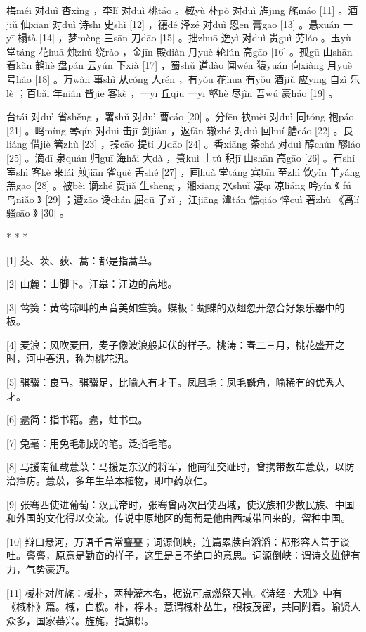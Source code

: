 \documentclass[12pt,UTF8]{ctexbook}
\begin{document}
梅méi 对duì 杏xìng ，李lǐ 对duì 桃táo 。棫yù 朴pò 对duì 旌jīng 旄máo [11] 。酒jiǔ 仙xiān 对duì 诗shī 史shǐ [12] ，德dé 泽zé 对duì 恩ēn 膏gāo [13] 。悬xuán 一yī 榻tà [14] ，梦mèng 三sān 刀dāo [15] 。拙zhuō 逸yì 对duì 贵guì 劳láo 。玉yù 堂táng 花huā 烛zhú 绕rào ，金jīn 殿diàn 月yuè 轮lún 高gāo [16] 。孤gū 山shān 看kàn 鹤hè 盘pán 云yún 下xià [17] ，蜀shǔ 道dào 闻wén 猿yuán 向xiàng 月yuè 号háo [18] 。万wàn 事shì 从cóng 人rén ，有yǒu 花huā 有yǒu 酒jiǔ 应yīng 自zì 乐lè ；百bǎi 年nián 皆jiē 客kè ，一yī 丘qiū 一yī 壑hè 尽jìn 吾wú 豪háo [19] 。

台tái 对duì 省shěng ，署shǔ 对duì 曹cáo [20] 。分fēn 袂mèi 对duì 同tóng 袍páo [21] 。鸣míng 琴qín 对duì 击jī 剑jiàn ，返fǎn 辙zhé 对duì 回huí 艚cáo [22] 。良liáng 借jiè 箸zhù [23] ，操cāo 提tí 刀dāo [24] 。香xiāng 茶chá 对duì 醇chún 醪láo [25] 。滴dī 泉quán 归guī 海hǎi 大dà ，篑kuì 土tǔ 积jī 山shān 高gāo [26] 。石shí 室shì 客kè 来lái 煎jiān 雀què 舌shé [27] ，画huà 堂táng 宾bīn 至zhì 饮yǐn 羊yáng 羔gāo [28] 。被bèi 谪zhé 贾jiǎ 生shēng ，湘xiāng 水shuǐ 凄qī 凉liáng 吟yín 《 fú 鸟niǎo 》 [29] ；遭zāo 谗chán 屈qū 子zǐ ，江jiāng 潭tán 憔qiáo 悴cuì 著zhù 《离lí 骚sāo 》 [30] 。



* * *



[1] 茭、茨、荻、蒿：都是指蒿草。

[2] 山麓：山脚下。江皋：江边的高地。

[3] 莺簧：黄莺啼叫的声音美如笙簧。蝶板：蝴蝶的双翅忽开忽合好象乐器中的板。

[4] 麦浪：风吹麦田，麦子像波浪般起伏的样子。桃涛：春二三月，桃花盛开之时，河中春汛，称为桃花汛。

[5] 骐骥：良马。骐骥足，比喻人有才干。凤凰毛：凤毛麟角，喻稀有的优秀人才。

[6] 蠹简：指书籍。蠹，蛀书虫。

[7] 兔毫：用兔毛制成的笔。泛指毛笔。

[8] 马援南征载薏苡：马援是东汉的将军，他南征交趾时，曾携带数车薏苡，以防治瘴疠。薏苡，多年生草本植物，即中药苡仁。

[9] 张骞西使进葡萄：汉武帝时，张骞曾两次出使西域，使汉族和少数民族、中国和外国的文化得以交流。传说中原地区的葡萄是他由西域带回来的，留种中国。

[10] 辩口悬河，万语千言常亹亹；词源倒峡，连篇累牍自滔滔：都形容人善于谈吐。亹亹，原意是勤奋的样子，这里是言不绝口的意思。词源倒峡：谓诗文雄健有力，气势豪迈。

[11] 棫朴对旌旄：棫朴，两种灌木名，据说可点燃祭天神。《诗经·大雅》中有《棫朴》篇。棫，白桵。朴，桴木。意谓棫朴丛生，根枝茂密，共同附着。喻贤人众多，国家蕃兴。旌旄，指旗帜。
\end{document}
